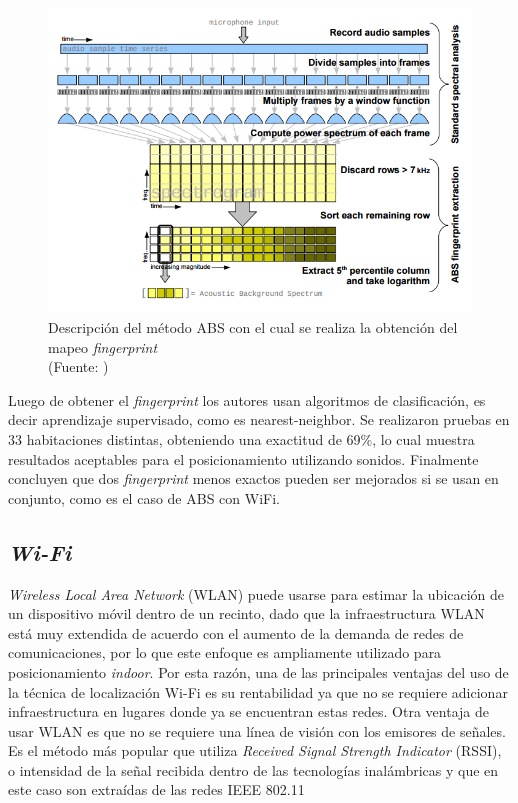 \begin{figure}[ht!]
\centering
\includegraphics[width=.6\textwidth]{figures/abs.png}
\caption[Método \textit{Acoustic Background Spectrum}]{Descripción del método ABS con el cual se realiza la obtención del mapeo \textit{fingerprint}\\
{\scriptsize (Fuente: \cite{Tarzia:2011:ILW:1999995.2000011})}}
\label{fig:abs}
\end{figure}

Luego de obtener el \textit{fingerprint} los autores usan algoritmos de clasificación, es decir aprendizaje supervisado, como es nearest-neighbor. Se realizaron pruebas en 33 habitaciones distintas, obteniendo una exactitud de 69\%, lo cual muestra resultados aceptables para el posicionamiento utilizando sonidos. Finalmente concluyen que dos \textit{fingerprint} menos exactos pueden ser mejorados si se usan en conjunto, como es el caso de ABS con WiFi.

\subsection{\textit{Wi-Fi}}

\textit{Wireless Local Area Network} (WLAN) puede usarse para estimar la ubicación de un dispositivo móvil dentro de un recinto, dado que la infraestructura WLAN está muy extendida de acuerdo con el aumento de la demanda de redes de comunicaciones, por lo que este enfoque es ampliamente utilizado para posicionamiento \textit{indoor}. Por esta razón, una de las principales ventajas del uso de la técnica de localización Wi-Fi es su rentabilidad ya que no se requiere adicionar infraestructura en lugares donde ya se encuentran estas redes. Otra ventaja de usar WLAN es que no se requiere una línea de visión con los emisores de señales. Es el método más popular que utiliza  \textit{Received Signal Strength Indicator} (RSSI), o intensidad de la señal recibida dentro de las tecnologías inalámbricas y que en este caso son extraídas de las redes IEEE 802.11

